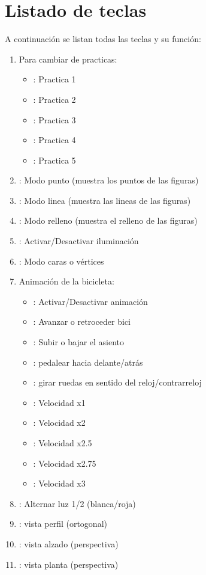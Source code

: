 \section{Listado de teclas}
A continuación se listan todas las teclas y su función:
\begin{enumerate}
	\item Para cambiar de practicas:
	\begin{itemize}
		\item {}: Practica 1
		\item {}: Practica 2
		\item {}: Practica 3
		\item {}: Practica 4
		\item {}: Practica 5
	\end{itemize}
	\item {}: Modo punto (muestra los puntos de las figuras)
	\item {}: Modo linea (muestra las lineas de las figuras)
	\item {}: Modo relleno (muestra el relleno de las figuras)
	\item {}: Activar/Desactivar iluminación
	\item {}: Modo caras o vértices
	\item Animación de la bicicleta:
	\begin{itemize}
		\item {}: Activar/Desactivar animación
		\item {}: Avanzar o retroceder bici
		\item {}: Subir o bajar el asiento
		\item {}: pedalear hacia delante/atrás
		\item {}: girar ruedas en sentido del reloj/contrarreloj
		\item {}: Velocidad x1
		\item {}: Velocidad x2
		\item {}: Velocidad x2.5
		\item {}: Velocidad x2.75
		\item {}: Velocidad x3
	\end{itemize}
	\item {}: Alternar luz 1/2 (blanca/roja)
	\item {}: vista perfil (ortogonal)
	\item {}: vista alzado (perspectiva)
	\item {}: vista planta (perspectiva)

\end{enumerate}
